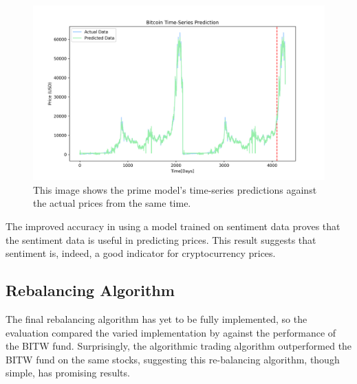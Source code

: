 \documentclass[10pt,twocolumn]{article}
\begin{document}
\begin{figure}
    \centering
    \includegraphics[scale=0.35]{images/SentimentPriceLSTMModel_whole_plot_bitcoin.png}
    \caption{
        This image shows the prime model's time-series predictions against the actual prices from the same time.
    }
    \label{sentiment-price-lstm-whole-plot}
\end{figure}

The improved accuracy in using a model trained on sentiment data proves that the sentiment data is useful in predicting prices. This result suggests that sentiment is, indeed, a good indicator for cryptocurrency prices.

\subsection{Rebalancing Algorithm}

The final rebalancing algorithm has yet to be fully implemented, so the evaluation compared the varied implementation by \textcite{algorithmictrading} against the performance of the BITW fund. Surprisingly, the algorithmic trading algorithm outperformed the BITW fund on the same stocks, suggesting this re-balancing algorithm, though simple, has promising results.
\end{document}
